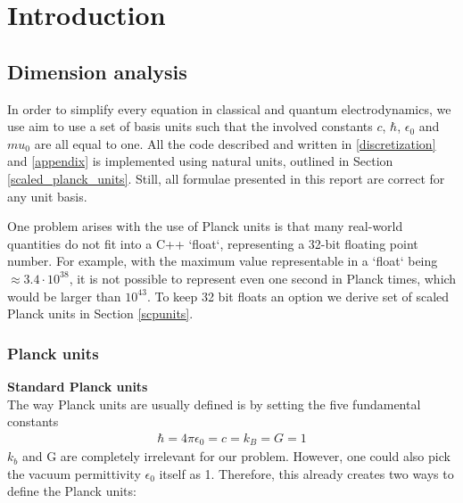 \documentclass[10pt]{report}
\let\Chapter\chapter
\def\chapter{\addtocontents{lol}{\protect\addvspace{10pt}}\Chapter}
\begin{document}



\newpage
{}

\chapter{Introduction}

\section{Dimension analysis}
In order to simplify every equation in classical and quantum electrodynamics, we use aim to use a set of basis units such that the involved constants $c$, $\hbar$, $\epsilon_0$ and $mu_0$ are all equal to one. All the code described and written in \ref{discretization} and \ref{appendix} is implemented using natural units, outlined in Section \ref{scaled_planck_units}. Still, all formulae presented in this report are correct for any unit basis.

One problem arises with the use of Planck units is that many real-world quantities do not fit into a C++ `float`, representing a 32-bit floating point number. For example, with the maximum value representable in a `float` being $\approx 3.4 \cdot 10^{38}$, it is not possible to represent even one second in Planck times, which would be larger than $10^{43}$. To keep 32 bit floats an option we derive set of scaled Planck units in Section \ref{scpunits}. 
\subsection{Planck units}
\textbf{Standard Planck units} \label{scaled_planck_units}
\\
The way Planck units are usually defined \cite{planckunits}  is by setting the five fundamental constants \begin{align*} \hbar = 4\pi \epsilon_0 = c = k_B = G = 1 \end{align*}
$k_b$ and G are completely irrelevant for our problem. However, one could also pick the vacuum permittivity $\epsilon_0$ itself as 1. Therefore, this already creates two ways to define the Planck units:
\end{document}
